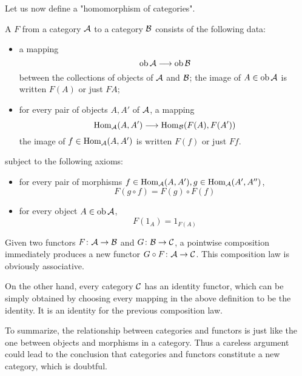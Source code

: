   Let us now define a "homomorphism of categories".
  \begin{defn}
    A  $F$ from a category ${\cal A}$ to a category ${\cal B}$ consists of the following data:
    \begin{itemize}
      \item a mapping
                 \begin{equation*}
                   \operatorname{ob}{\cal A}\longrightarrow\operatorname{ob}{\cal B}
                 \end{equation*}
                 between the collections of objects of ${\cal A}$ and ${\cal B}$; the image of $A\in\operatorname{ob}{\cal A}$ is written $F(A)$ or just $F A$;
      \item for every pair of objects $A, A'$ of ${\cal A}$, a mapping
                 \begin{equation*}
                   \operatorname{Hom}_{{\cal A}}(A,A')\longrightarrow\operatorname{Hom}_{{\cal B}}(F(A),F(A'))
                 \end{equation*}
                 the image of $f\in\operatorname{Hom}_{{\cal A}}(A,A')$ is written $F(f)$ or just $F f$.
    \end{itemize}
    subject to the following axioms:
    \begin{itemize}
      \item for every pair of morphisms $f\in\operatorname{Hom}_{{\cal A}}(A,A'), g\in\operatorname{Hom}_{{\cal A}}(A',A'')$,
                 \begin{equation*}
                   F(g\circ f) = F(g)\circ F(f)
                 \end{equation*}
      \item for every object $A\in\operatorname{ob}{\cal A}$,
                 \begin{equation*}
                   F(1_A) = 1_{F(A)}
                 \end{equation*}
    \end{itemize}
  \end{defn}

  Given two functors $F\colon{\cal A}\to{\cal B}$ and $G\colon{\cal B}\to{\cal C}$, a pointwise composition immediately produces a new functor $G\circ F\colon{\cal A}\to{\cal C}$. This composition law is obviously associative.

  On the other hand, every category ${\cal C}$ has an identity functor, which can be simply obtained by choosing every mapping in the above definition to be the identity. It is an identity for the previous composition law.

  To summarize, the relationship between categories and functors is just like the one between objects and morphisms in a category. Thus a careless argument could lead to the conclusion that categories and functors constitute a new category, which is doubtful.

